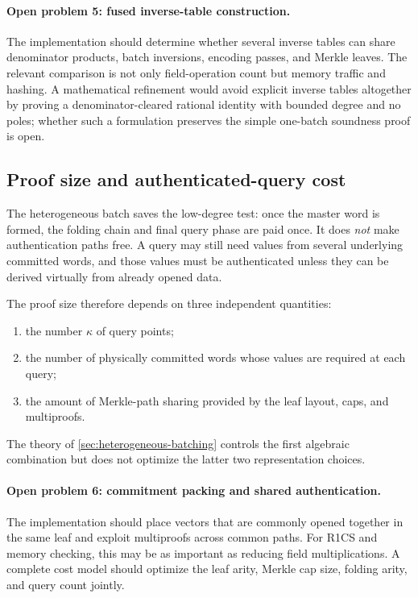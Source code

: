 \paragraph{Open problem 5: fused inverse-table construction.}
The implementation should determine whether several inverse tables can share denominator products, batch inversions, encoding passes, and Merkle leaves.  The relevant comparison is not only field-operation count but memory traffic and hashing.  A mathematical refinement would avoid explicit inverse tables altogether by proving a denominator-cleared rational identity with bounded degree and no poles; whether such a formulation preserves the simple one-batch soundness proof is open.

\subsection{Proof size and authenticated-query cost}
\label{sec:limitations-proof-size}

The heterogeneous batch saves the low-degree test: once the master word is formed, the folding chain and final query phase are paid once.  It does \emph{not} make authentication paths free.  A query may still need values from several underlying committed words, and those values must be authenticated unless they can be derived virtually from already opened data.

The proof size therefore depends on three independent quantities:
\begin{enumerate}[label=(\roman*),leftmargin=*]
  \item the number $\kappa$ of query points;
  \item the number of physically committed words whose values are required at each query;
  \item the amount of Merkle-path sharing provided by the leaf layout, caps, and multiproofs.
\end{enumerate}
The theory of \cref{sec:heterogeneous-batching} controls the first algebraic combination but does not optimize the latter two representation choices.

\paragraph{Open problem 6: commitment packing and shared authentication.}
The implementation should place vectors that are commonly opened together in the same leaf and exploit multiproofs across common paths.  For R1CS and memory checking, this may be as important as reducing field multiplications.  A complete cost model should optimize the leaf arity, Merkle cap size, folding arity, and query count jointly.

